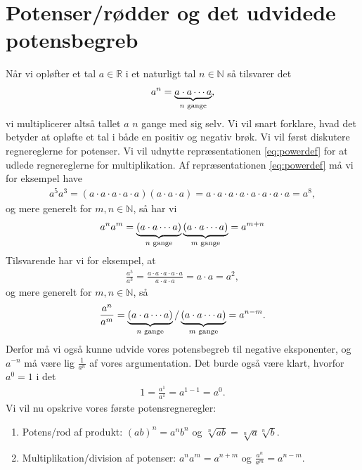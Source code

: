 \section*{Potenser/rødder og det udvidede potensbegreb}

Når vi opløfter et tal $a\in \mathbb{R}$ i et naturligt tal $n\in \mathbb{N}$ så tilsvarer det
\begin{align}\label{eq:powerdef}
a^n = \underbrace{a\cdot a \cdots a}_{n\textnormal{ gange}},
\end{align}
vi multiplicerer altså tallet $a$ $n$ gange med sig selv. Vi vil snart forklare, hvad det betyder at opløfte et tal i både en positiv og negativ brøk. Vi vil først diskutere regnereglerne for potenser. Vi vil udnytte repræsentationen \eqref{eq:powerdef} for at udlede regnereglerne for multiplikation.
Af repræsentationen \eqref{eq:powerdef} må vi for eksempel have
\begin{align*}
a^5a^3 = (a\cdot a\cdot a\cdot a\cdot a)(a\cdot a\cdot a) = a\cdot a\cdot a\cdot a\cdot a\cdot a\cdot a\cdot a = a^8, 
\end{align*}
og mere generelt for $m,n\in \mathbb{N}$, så har vi
\begin{align*}
a^na^m = \underbrace{(a\cdot a\cdots a)}_{n \textnormal{ gange}}\underbrace{(a\cdot a\cdots a)}_{m \textnormal{ gange}} = a^{m+n}
\end{align*}
Tilsvarende har vi for eksempel, at 
\begin{align*}
\frac{a^5}{a^3} = \frac{a\cdot a\cdot a\cdot a\cdot a}{a\cdot a\cdot a} = a\cdot a =a^2,
\end{align*}
og mere generelt for $m,n\in \mathbb{N}$, så
\begin{align*}
\frac{a^n}{a^m} = \underbrace{(a \cdot a \cdots a)}_{n\textnormal{ gange}}/\underbrace{(a \cdot a \cdots a)}_{m\textnormal{ gange}} = a^{n-m}.
\end{align*}
Derfor må vi også kunne udvide vores potensbegreb til negative eksponenter, og $a^{-n}$ må være lig $\frac{1}{a^n}$ af vores argumentation. Det burde også være klart, hvorfor $a^0 =1$ i det 
\begin{align*}
1 = \frac{a^{1}}{a^{1}} = a^{1-1} = a^0.
\end{align*}
Vi vil nu opskrive vores første potensregneregler:
\begin{enumerate}[label=\roman*)]
\item Potens/rod af produkt: $(ab)^n =a^nb^n $ og $\sqrt[n]{ab} = \sqrt[n]{a}\sqrt[n]{b}$.
\item Multiplikation/division af potenser: $a^na^m = a^{n+m}$ og $\frac{a^n}{a^m} = a^{n-m}$.
\end{enumerate}

